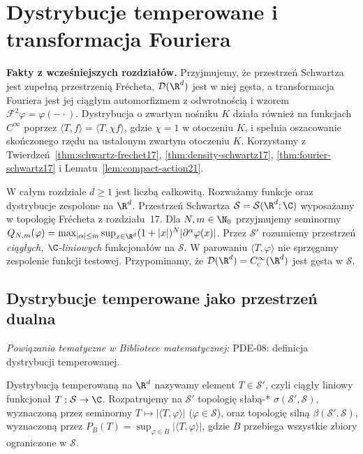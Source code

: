 \setcounter{section}{6}
\section{Dystrybucje temperowane i transformacja Fouriera}
\label{sec:temperowane22}

\providecommand{\atlasref}[2]{#2}


\noindent\textbf{Fakty z wcześniejszych rozdziałów.}
Przyjmujemy, że przestrzeń Schwartza jest zupełną przestrzenią Frécheta,
$\mathcal D(\R^d)$ jest w niej gęsta, a transformacja Fouriera
jest jej ciągłym automorfizmem z odwrotnością i wzorem
$\mathcal F^2\varphi=\varphi(-\cdot)$.
Dystrybucja o zwartym nośniku $K$ działa również na funkcjach
$C^\infty$ poprzez $\langle T,f\rangle=\langle T,\chi f\rangle$,
gdzie $\chi=1$ w otoczeniu $K$, i spełnia oszacowanie
skończonego rzędu na ustalonym zwartym otoczeniu $K$.
Korzystamy z Twierdzeń~\ref{thm:schwartz-frechet17},
\ref{thm:density-schwartz17}, \ref{thm:fourier-schwartz17}
i Lematu~\ref{lem:compact-action21}.

W całym rozdziale $d\ge1$ jest liczbą całkowitą.
Rozważamy funkcje oraz dystrybucje zespolone na $\R^d$.
Przestrzeń Schwartza $\mathcal S=\mathcal S(\R^d;\C)$
wyposażamy w topologię Frécheta z rozdziału~17.
Dla $N,m\in\N_0$ przyjmujemy seminormy
$Q_{N,m}(\varphi)=\max_{|\alpha|\le m}\sup_{x\in\R^d}
(1+|x|)^N|\partial^\alpha\varphi(x)|$.
Przez $\mathcal S'$ rozumiemy przestrzeń \emph{ciągłych,
$\C$-liniowych} funkcjonałów na $\mathcal S$.
W parowaniu $\langle T,\varphi\rangle$ nie sprzęgamy zespolenie
funkcji testowej. Przypominamy, że
$\mathcal D(\R^d)=C_c^\infty(\R^d)$ jest gęsta w $\mathcal S$.

\subsection{Dystrybucje temperowane jako przestrzeń dualna}

\noindent\emph{Powiązania tematyczne w Bibliotece matematycznej:} \atlasref{PDE-08::def:pde8-tempered}{PDE-08: definicja dystrybucji temperowanej}.


\begin{definicja}
\label{def:tempered22}
Dystrybucją temperowaną na $\R^d$ nazywamy element
$T\in\mathcal S'$, czyli ciągły liniowy funkcjonał
$T:\mathcal S\to\C$. Rozpatrujemy na $\mathcal S'$ topologię
słabą-* $\sigma(\mathcal S',\mathcal S)$, wyznaczoną przez
seminormy $T\mapsto|\langle T,\varphi\rangle|$
($\varphi\in\mathcal S$), oraz topologię silną
$\beta(\mathcal S',\mathcal S)$, wyznaczoną przez
$P_B(T)=\sup_{\varphi\in B}|\langle T,\varphi\rangle|$,
gdzie $B$ przebiega wszystkie zbiory ograniczone w $\mathcal S$.
\end{definicja}

